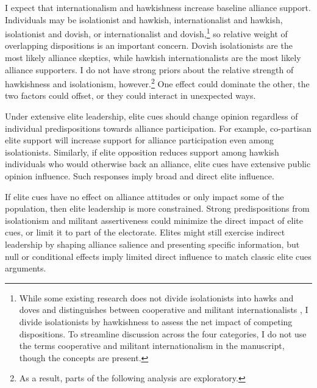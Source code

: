 \documentclass[12pt]{article}
\begin{document}
I expect that internationalism and hawkishness increase baseline alliance support.
Individuals may be isolationist and hawkish, internationalist and hawkish, isolationist and dovish, or internationalist and dovish,\footnote{While some existing research does not divide isolationists into hawks and doves and distinguishes between cooperative and militant internationalists \citep{Kertzeretal2014}, I divide isolationists by hawkishness to assess the net impact of competing dispositions. To streamline discussion across the four categories, I do not use the terms cooperative and militant internationalism in the manuscript, though the concepts are present.} so relative weight of overlapping dispositions is an important concern.
Dovish isolationists are the most likely alliance skeptics, while hawkish internationalists are the most likely alliance supporters. 
I do not have strong priors about the relative strength of hawkishness and isolationism, however.\footnote{As a result, parts of the following analysis are exploratory.}
One effect could dominate the other, the two factors could offset, or they could interact in unexpected ways.




Under extensive elite leadership, elite cues should change opinion regardless of individual predispositions towards alliance participation. 
For example, co-partisan elite support will increase support for alliance participation even among isolationists. 
Similarly, if elite opposition reduces support among hawkish individuals who would otherwise back an alliance, elite cues have extensive public opinion influence. 
Such responses imply broad and direct elite influence. 


If elite cues have no effect on alliance attitudes or only impact some of the population, then elite leadership is more constrained.
Strong predispositions from isolationism and militant assertiveness could minimize the direct impact of elite cues, or limit it to part of the electorate.
Elites might still exercise indirect leadership by shaping alliance salience and presenting specific information, but null or conditional effects imply limited direct influence to match classic elite cues arguments. 
\end{document}
